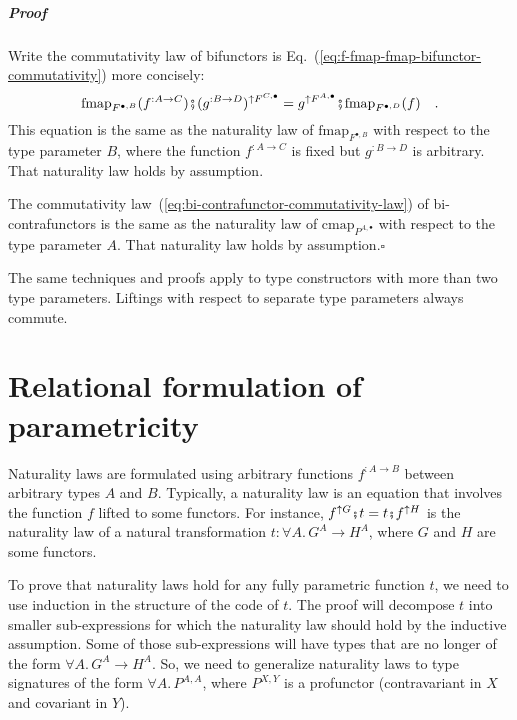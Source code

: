 \subparagraph{Proof}

Write the commutativity law of bifunctors is Eq.~(\ref{eq:f-fmap-fmap-bifunctor-commutativity})
more concisely:
\[
\text{fmap}_{F^{\bullet,B}}(f^{:A\rightarrow C})\bef(g^{:B\rightarrow D})^{\uparrow F^{C,\bullet}}=g^{\uparrow F^{A,\bullet}}\bef\text{fmap}_{F^{\bullet,D}}(f)\quad.
\]
This equation is the same as the naturality law of $\text{fmap}_{F^{\bullet,B}}$
with respect to the type parameter $B$, where the function $f^{:A\rightarrow C}$
is fixed but $g^{:B\rightarrow D}$ is arbitrary. That naturality
law holds by assumption.

The commutativity law~(\ref{eq:bi-contrafunctor-commutativity-law})
of bi-contrafunctors is the same as the naturality law of $\text{cmap}_{P^{A,\bullet}}$
with respect to the type parameter $A$. That naturality law holds
by assumption.$\square$

The same techniques and proofs apply to type constructors with more
than two type parameters. Liftings with respect to separate type
parameters always commute.

\section{Relational formulation of parametricity\label{sec:Parametricity-theorem-for-relations}\label{subsec:Relations-between-types}}

Naturality laws are formulated using arbitrary functions $f^{:A\rightarrow B}$
between arbitrary types $A$ and $B$. Typically, a naturality law
is an equation that involves the function $f$ lifted to some functors.
For instance, $f^{\uparrow G}\bef t=t\bef f^{\uparrow H}$ is the
naturality law of a natural transformation $t:\forall A.\,G^{A}\rightarrow H^{A}$,
where $G$ and $H$ are some functors.

To prove that naturality laws hold for any fully parametric function
$t$, we need to use induction in the structure of the code of $t$.
The proof will decompose $t$ into smaller sub-expressions for which
the naturality law should hold by the inductive assumption. Some of
those sub-expressions will have types that are no longer of the form
$\forall A.\,G^{A}\rightarrow H^{A}$. So, we need to generalize naturality
laws to type signatures of the form $\forall A.\,P^{A,A}$, where
$P^{X,Y}$ is a profunctor (contravariant in $X$ and covariant in
$Y$). 

